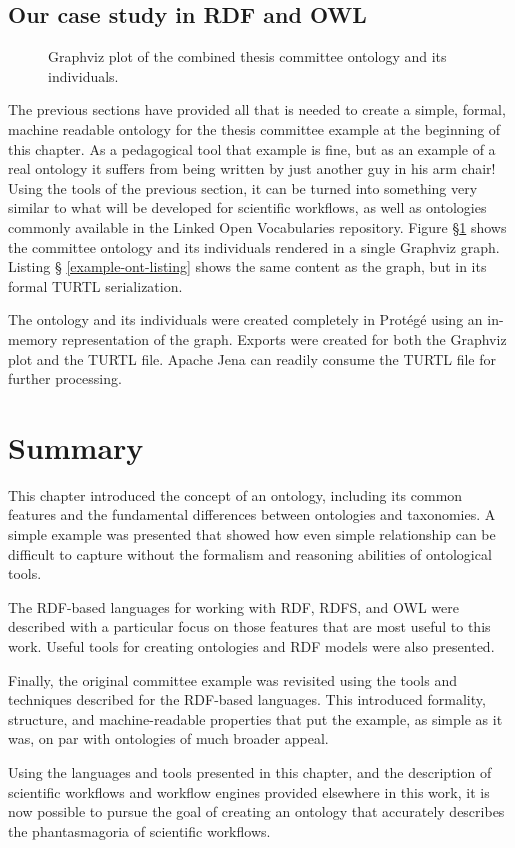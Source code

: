 \subsection{Our case study in RDF and OWL}

\begin{figure}[htbp]
\centering
{}
\caption{Graphviz plot of the combined thesis committee ontology and its
individuals.}
\label{example-ont-graphic}
\end{figure}

The previous sections have provided all that is needed to create a simple,
formal, machine readable ontology for the thesis committee example at the
beginning of this chapter. As a pedagogical tool that example is fine, but as
an example of a real ontology it suffers from being written by just another guy
in his arm chair! Using the tools of the previous section, it can be turned
into something very similar to what will be developed for scientific workflows,
as well as ontologies commonly available in the Linked Open Vocabularies
repository. Figure \S \ref{example-ont-graphic} shows the committee ontology and
its individuals rendered in a single Graphviz graph. Listing \S
\ref{example-ont-listing} shows the same content as the graph, but in its
formal TURTL serialization.



The ontology and its individuals were created completely in Prot\'eg\'e using an
in-memory representation of the graph. Exports were created for both the
Graphviz plot and the TURTL file. Apache Jena can readily consume the TURTL file
for further processing.

\section{Summary}

This chapter introduced the concept of an ontology, including its common
features and the fundamental differences between ontologies and taxonomies. A
simple example was presented that showed how even simple relationship can be
difficult to capture without the formalism and reasoning abilities of
ontological tools.

The RDF-based languages for working with RDF, RDFS, and OWL were described with
a particular focus on those features that are most useful to this work. Useful
tools for creating ontologies and RDF models were also presented.

Finally, the original committee example was revisited using the tools and
techniques described for the RDF-based languages. This introduced formality,
structure, and machine-readable properties that put the example, as simple as it
was, on par with ontologies of much broader appeal.

Using the languages and tools presented in this chapter, and the description of
scientific workflows and workflow engines provided elsewhere in this work, it is
now possible to pursue the goal of creating an ontology that accurately
describes the phantasmagoria of scientific workflows.
